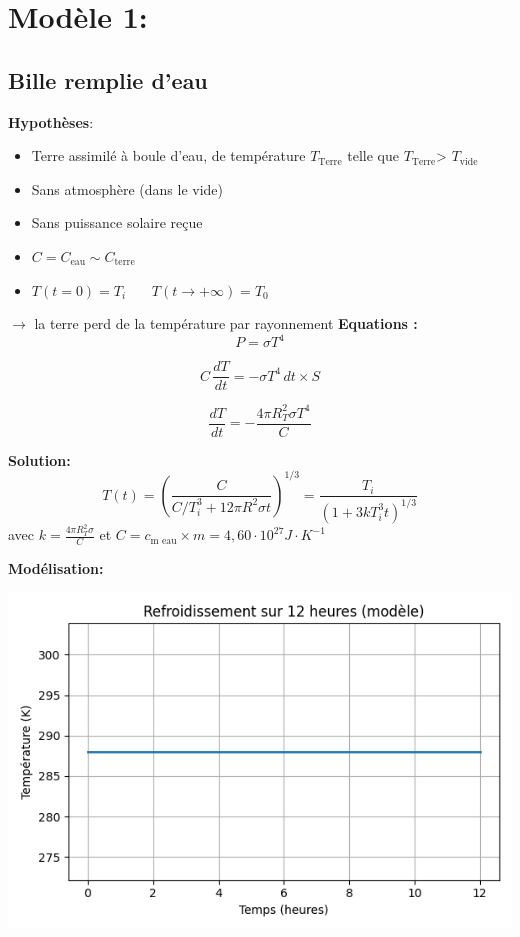 \documentclass[a4paper,12pt]{article}
\begin{document}
\section{Modèle 1:}
\subsection{Bille remplie d'eau}
\textbf{Hypothèses}:
\begin{itemize}
    \item Terre assimilé à boule d'eau, de température \(T_{\text{Terre}}\) telle que \(T_{\text{Terre}}\)> \(T_{\text{vide}}\)
    \item  Sans atmosphère (dans le vide)
    \item  Sans puissance solaire reçue  
    \item \(C= C_{\text{eau}} \sim C_{\text{terre}}\) 
    \item $T(t=0) = T_i$ \ \ \
$T(t \to +\infty) = T_0$
   
\end{itemize}
$\rightarrow$ la terre perd de la température par rayonnement
\textbf{Equations :} 
\[   P= \sigma T^4 
\]

\[    C \, \frac{dT}{dt} = - \sigma T^4 \, dt \times S
\]

\[\frac{dT}{dt} = - \frac{4 \pi R_T^2 \sigma T^4}{C}\]  

\textbf{Solution:} 
\[
T(t) = \left( \frac{C}{C/T_i^3 + 12\pi R^2 \sigma t} \right)^{1/3} 
= \frac{T_i}{\left(1 + 3k T_i^3 t \right)^{1/3}}
\]
avec \(k=\frac{4\pi R_T^2 \sigma}{C}\)
et \(C=c_{\text{m eau}}\times m=4,60 \cdot 10^{27} J\cdot K^{-1}\)

\bigskip



\bigskip
\textbf{Modélisation:} 
    
    \includegraphics[width=0.8\linewidth]{../modele1/figures/modele1.png}
\\
\end{document}
